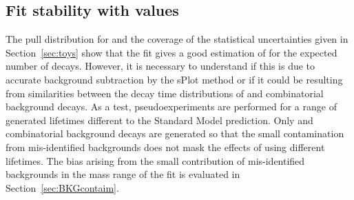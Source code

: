 
\subsection[Fit stability with \tmumu values]{Fit stability with \boldmath{\tmumu} values}

The pull distribution for \Gmumu and the coverage of the statistical uncertainties given in Section~\ref{sec:toys} show that the fit gives a good estimation of \tmumu for the expected number of decays. However, it is necessary to understand if this is due to accurate background subtraction by the sPlot method or if it could be resulting from similarities between the decay time distributions of \bsmumu and combinatorial background decays. As a test, pseudoexperiments are performed for a range of generated \bsmumu lifetimes different to the Standard Model prediction. Only \bsmumu and combinatorial background decays are generated so that the small contamination from mis-identified backgrounds does not mask the effects of using different lifetimes. The bias arising from the small contribution of mis-identified backgrounds in the mass range of the fit is evaluated in Section~\ref{sec:BKGcontaim}. 

